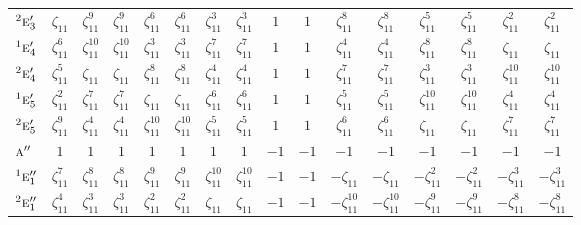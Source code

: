 \documentclass[10pt,a4paper]{article}
\numberwithin{equation}{section}
\newcommand{\irr}[1]{\text{\normalfont\scshape #1}}
\newcommand{\conjpair}[1]{{}^{#1}}
\newcommand{\rootunity}[1]{\zeta_{#1}}
\begin{document}
{\begin{longtable}{@{}lccccccccccccccc@{}}
$\conjpair{2}\irr{e}_{3}'$ & $\rootunity{11}$ & $\rootunity{11}^{9}$ & $\rootunity{11}^{9}$ & $\rootunity{11}^{6}$ & $\rootunity{11}^{6}$ & $\rootunity{11}^{3}$ & $\rootunity{11}^{3}$ & $1$ & $1$ & $\rootunity{11}^{8}$ & $\rootunity{11}^{8}$ & $\rootunity{11}^{5}$ & $\rootunity{11}^{5}$ & $\rootunity{11}^{2}$ & $\rootunity{11}^{2}$\\
$\conjpair{1}\irr{e}_{4}'$ & $\rootunity{11}^{6}$ & $\rootunity{11}^{10}$ & $\rootunity{11}^{10}$ & $\rootunity{11}^{3}$ & $\rootunity{11}^{3}$ & $\rootunity{11}^{7}$ & $\rootunity{11}^{7}$ & $1$ & $1$ & $\rootunity{11}^{4}$ & $\rootunity{11}^{4}$ & $\rootunity{11}^{8}$ & $\rootunity{11}^{8}$ & $\rootunity{11}$ & $\rootunity{11}$\\
$\conjpair{2}\irr{e}_{4}'$ & $\rootunity{11}^{5}$ & $\rootunity{11}$ & $\rootunity{11}$ & $\rootunity{11}^{8}$ & $\rootunity{11}^{8}$ & $\rootunity{11}^{4}$ & $\rootunity{11}^{4}$ & $1$ & $1$ & $\rootunity{11}^{7}$ & $\rootunity{11}^{7}$ & $\rootunity{11}^{3}$ & $\rootunity{11}^{3}$ & $\rootunity{11}^{10}$ & $\rootunity{11}^{10}$\\
$\conjpair{1}\irr{e}_{5}'$ & $\rootunity{11}^{2}$ & $\rootunity{11}^{7}$ & $\rootunity{11}^{7}$ & $\rootunity{11}$ & $\rootunity{11}$ & $\rootunity{11}^{6}$ & $\rootunity{11}^{6}$ & $1$ & $1$ & $\rootunity{11}^{5}$ & $\rootunity{11}^{5}$ & $\rootunity{11}^{10}$ & $\rootunity{11}^{10}$ & $\rootunity{11}^{4}$ & $\rootunity{11}^{4}$\\
$\conjpair{2}\irr{e}_{5}'$ & $\rootunity{11}^{9}$ & $\rootunity{11}^{4}$ & $\rootunity{11}^{4}$ & $\rootunity{11}^{10}$ & $\rootunity{11}^{10}$ & $\rootunity{11}^{5}$ & $\rootunity{11}^{5}$ & $1$ & $1$ & $\rootunity{11}^{6}$ & $\rootunity{11}^{6}$ & $\rootunity{11}$ & $\rootunity{11}$ & $\rootunity{11}^{7}$ & $\rootunity{11}^{7}$\\
$\irr{a}''$ & $1$ & $1$ & $1$ & $1$ & $1$ & $1$ & $1$ & $-1$ & $-1$ & $-1$ & $-1$ & $-1$ & $-1$ & $-1$ & $-1$\\
$\conjpair{1}\irr{e}_{1}''$ & $\rootunity{11}^{7}$ & $\rootunity{11}^{8}$ & $\rootunity{11}^{8}$ & $\rootunity{11}^{9}$ & $\rootunity{11}^{9}$ & $\rootunity{11}^{10}$ & $\rootunity{11}^{10}$ & $-1$ & $-1$ & $-\rootunity{11}$ & $-\rootunity{11}$ & $-\rootunity{11}^{2}$ & $-\rootunity{11}^{2}$ & $-\rootunity{11}^{3}$ & $-\rootunity{11}^{3}$\\
$\conjpair{2}\irr{e}_{1}''$ & $\rootunity{11}^{4}$ & $\rootunity{11}^{3}$ & $\rootunity{11}^{3}$ & $\rootunity{11}^{2}$ & $\rootunity{11}^{2}$ & $\rootunity{11}$ & $\rootunity{11}$ & $-1$ & $-1$ & $-\rootunity{11}^{10}$ & $-\rootunity{11}^{10}$ & $-\rootunity{11}^{9}$ & $-\rootunity{11}^{9}$ & $-\rootunity{11}^{8}$ & $-\rootunity{11}^{8}$\\

\end{longtable}}
\end{document}
